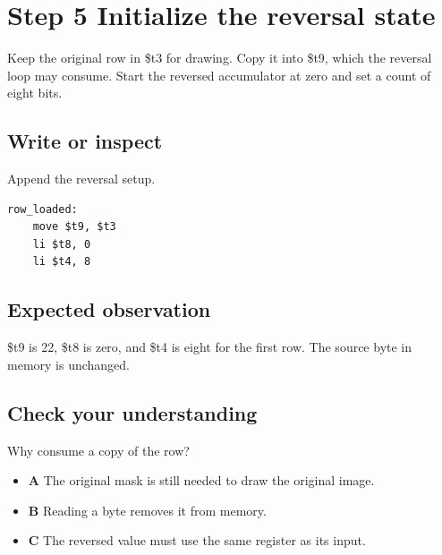 \section{Step 5 Initialize the reversal
  state}\label{003-eight-byte-sprite-s05-step-5-initialize-the-reversal-state}

Keep the original row in \$t3 for drawing. Copy it into \$t9, which the
reversal loop may consume. Start the reversed accumulator at zero and
set a count of eight bits.

\subsection{Write or
  inspect}\label{003-eight-byte-sprite-s05-write-or-inspect}

Append the reversal setup.

\begin{verbatim}
row_loaded:
    move $t9, $t3
    li $t8, 0
    li $t4, 8
\end{verbatim}

\subsection{Expected
  observation}\label{003-eight-byte-sprite-s05-expected-observation}

\$t9 is 22, \$t8 is zero, and \$t4 is eight for the first row. The
source byte in memory is unchanged.

\subsection{Check your
  understanding}\label{003-eight-byte-sprite-s05-check-your-understanding}

Why consume a copy of the row?

\begin{itemize}
  \tightlist
  \item
        \textbf{A} The original mask is still needed to draw the original
        image.
  \item
        \textbf{B} Reading a byte removes it from memory.
  \item
        \textbf{C} The reversed value must use the same register as its input.
\end{itemize}
